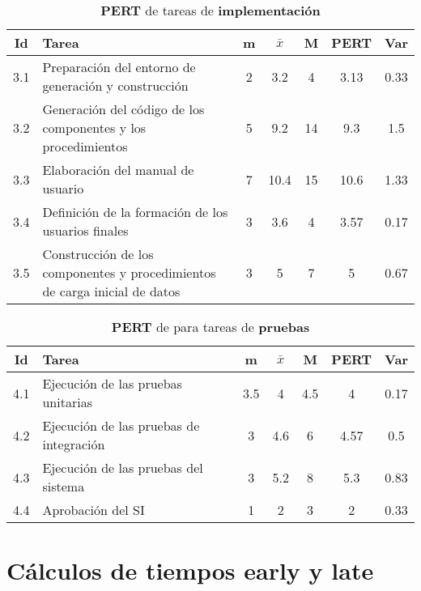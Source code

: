 \documentclass[11pt,a4paper,spanish,twoside]{report}
\begin{document}
\begin{table}[!h]
\centering
  \begin{tabular}{|c||p{5.3cm}||c|c|c||c|c|}
    \hline
    \textbf{Id} & \textbf{Tarea} & \textbf{m} & 
    \textbf{$\bar{x}$} &\textbf{M} & \textbf{PERT} & \textbf{Var}\\
    \hline \hline
    3.1 & Preparación del entorno de generación y construcción & 2 & 3.2  & 4
    & 3.13 & 0.33\\
    \hline
    3.2 & Generación del código de los componentes y los procedimientos & 5 &
    9.2 & 14 & 9.3 & 1.5\\
    \hline
    3.3 & Elaboración del manual de usuario & 7 & 10.4 & 15 & 10.6 & 1.33\\
    \hline
    3.4 & Definición de la formación de los usuarios finales & 3 & 3.6 & 4
    &3.57 & 0.17\\
    \hline
    3.5 & Construcción de los componentes y procedimientos de carga inicial
    de datos & 3 & 5 & 7 & 5 & 0.67\\
    \hline
  \end{tabular}
  \caption{\textbf{PERT} de tareas de \textbf{implementación}}
  \label{Tab:tareas3}
\end{table}

\begin{table}[!h]
\centering
  \begin{tabular}{|c||p{5.3cm}||c|c|c||c|c|}
    \hline
    \textbf{Id} & \textbf{Tarea} & \textbf{m} & 
    \textbf{$\bar{x}$} &\textbf{M} & \textbf{PERT} & \textbf{Var}\\
    \hline \hline
    4.1 & Ejecución de las pruebas unitarias & 3.5 & 4 & 4.5 & 4 & 0.17\\
    \hline
    4.2 & Ejecución de las pruebas de integración & 3 & 4.6 & 6 & 4.57 & 0.5\\
    \hline
    4.3 & Ejecución de las pruebas del sistema & 3 & 5.2 & 8 & 5.3 & 0.83\\
    \hline
    4.4 & Aprobación del SI & 1 & 2 & 3 & 2 & 0.33\\
    \hline
  \end{tabular}
  \caption{\textbf{PERT} de para tareas de \textbf{pruebas}}
  \label{Tab:tareas4}
\end{table}

\section{Cálculos de tiempos early y late}
\end{document}
